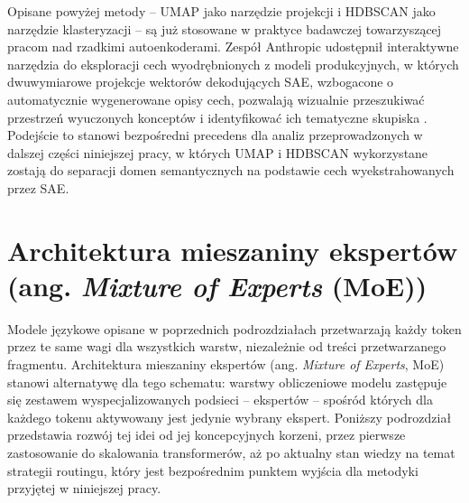 Opisane powyżej metody -- UMAP jako narzędzie projekcji i HDBSCAN jako narzędzie klasteryzacji -- są już stosowane w praktyce badawczej towarzyszącej pracom nad rzadkimi autoenkoderami. Zespół Anthropic udostępnił interaktywne narzędzia do eksploracji cech wyodrębnionych z modeli produkcyjnych, w których dwuwymiarowe projekcje wektorów dekodujących SAE, wzbogacone o automatycznie wygenerowane opisy cech, pozwalają wizualnie przeszukiwać przestrzeń wyuczonych konceptów i identyfikować ich tematyczne skupiska \cite{templeton_scaling_monosemanticity}. Podejście to stanowi bezpośredni precedens dla analiz przeprowadzonych w dalszej części niniejszej pracy, w których UMAP i HDBSCAN wykorzystane zostają do separacji domen semantycznych na podstawie cech wyekstrahowanych przez SAE.


\section{Architektura mieszaniny ekspertów (ang. \textit{Mixture of Experts} (MoE))}
\label{sec:moe_architektury}
Modele językowe opisane w poprzednich podrozdziałach przetwarzają każdy token przez te same wagi dla wszystkich warstw, niezależnie od treści przetwarzanego fragmentu. Architektura mieszaniny ekspertów  (ang. \textit{Mixture of Experts}, MoE) stanowi alternatywę dla tego schematu: warstwy obliczeniowe modelu zastępuje się zestawem wyspecjalizowanych podsieci -- ekspertów -- spośród których dla każdego tokenu aktywowany jest jedynie wybrany ekspert. Poniższy podrozdział przedstawia rozwój tej idei od jej koncepcyjnych korzeni, przez pierwsze zastosowanie do skalowania transformerów, aż po aktualny stan wiedzy na temat strategii routingu, który jest bezpośrednim punktem wyjścia dla metodyki przyjętej w niniejszej pracy.
